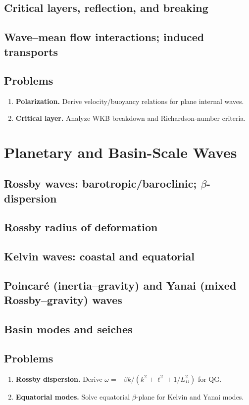 \documentclass[12pt]{book}
\begin{document}
\section{Critical layers, reflection, and breaking}
\section{Wave--mean flow interactions; induced transports}
\section*{Problems}
\begin{enumerate}
  \item \textbf{Polarization.} Derive velocity/buoyancy relations for plane internal waves.
  \item \textbf{Critical layer.} Analyze WKB breakdown and Richardson-number criteria.
\end{enumerate}

\chapter{Planetary and Basin-Scale Waves}
\section{Rossby waves: barotropic/baroclinic; $\beta$-dispersion}
\section{Rossby radius of deformation}
\section{Kelvin waves: coastal and equatorial}
\section{Poincar\'e (inertia--gravity) and Yanai (mixed Rossby--gravity) waves}
\section{Basin modes and seiches}
\section*{Problems}
\begin{enumerate}
  \item \textbf{Rossby dispersion.} Derive $\omega = -\beta k/(k^2+\ell^2+1/L_D^2)$ for QG.
  \item \textbf{Equatorial modes.} Solve equatorial $\beta$-plane for Kelvin and Yanai modes.
\end{enumerate}
\end{document}
